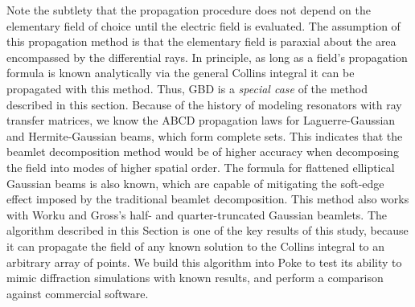  Note the subtlety that the propagation procedure does not depend on the elementary field of choice until the electric field is evaluated. The assumption of this propagation method is that the elementary field is paraxial about the area encompassed by the differential rays. In principle, as long as a field's propagation formula is known analytically via the general Collins integral it can be propagated with this method. Thus, GBD is a \emph{special case} of the method described in this section. Because of the history of modeling resonators with ray transfer matrices, we know the ABCD propagation laws for Laguerre-Gaussian\cite{Mei_2005} and Hermite-Gaussian\cite{CAI2002139} beams, which form complete sets. This indicates that the beamlet decomposition method would be of higher accuracy when decomposing the field into modes of higher spatial order. The formula for flattened elliptical Gaussian beams is also known\cite{CAI2002139}, which are capable of mitigating the soft-edge effect imposed by the traditional beamlet decomposition\cite{greynolds_ten_2020}. This method also works with Worku and Gross's half- and quarter-truncated Gaussian beamlets\cite{Worku19}. The algorithm described in this Section is one of the key results of this study, because it can propagate the field of any known solution to the Collins integral to an arbitrary array of points. We build this algorithm into Poke to test its ability to mimic diffraction simulations with known results, and perform a comparison against commercial software.